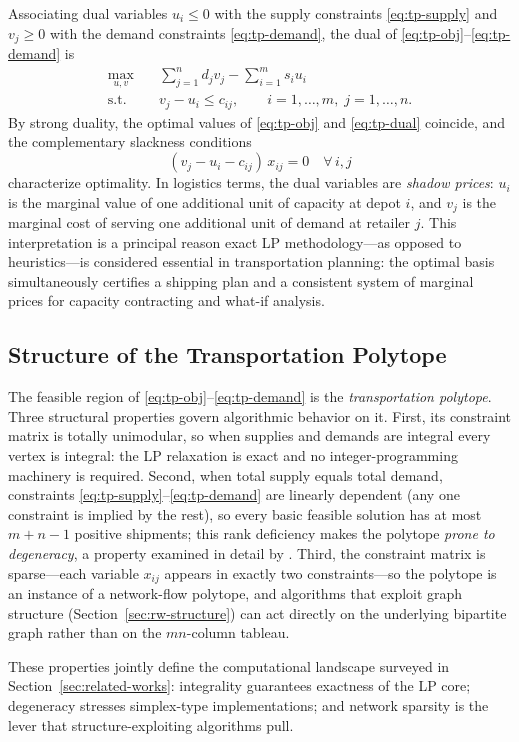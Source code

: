 Associating dual variables $u_i \leq 0$ with the supply constraints \eqref{eq:tp-supply} and $v_j \geq 0$ with the demand constraints \eqref{eq:tp-demand}, the dual of \eqref{eq:tp-obj}--\eqref{eq:tp-demand} is
\begin{align}
  \max_{u, v} \quad & \sum_{j=1}^{n} d_j v_j - \sum_{i=1}^{m} s_i u_i
    \label{eq:tp-dual}\\
  \text{s.t.} \quad & v_j - u_i \leq c_{ij}, \qquad i = 1,\dots,m,\; j = 1,\dots,n.
    \nonumber
\end{align}
By strong duality, the optimal values of \eqref{eq:tp-obj} and \eqref{eq:tp-dual} coincide, and the complementary slackness conditions
\begin{equation}
  (v_j - u_i - c_{ij})\, x_{ij} = 0 \quad \forall\, i, j
  \label{eq:compl-slack}
\end{equation}
characterize optimality. In logistics terms, the dual variables are \emph{shadow prices}: $u_i$ is the marginal value of one additional unit of capacity at depot $i$, and $v_j$ is the marginal cost of serving one additional unit of demand at retailer $j$. This interpretation is a principal reason exact LP methodology---as opposed to heuristics---is considered essential in transportation planning: the optimal basis simultaneously certifies a shipping plan and a consistent system of marginal prices for capacity contracting and what-if analysis.

\subsection{Structure of the Transportation Polytope}
\label{sec:polytope}

The feasible region of \eqref{eq:tp-obj}--\eqref{eq:tp-demand} is the \emph{transportation polytope}. Three structural properties govern algorithmic behavior on it. First, its constraint matrix is totally unimodular, so when supplies and demands are integral every vertex is integral: the LP relaxation is exact and no integer-programming machinery is required. Second, when total supply equals total demand, constraints \eqref{eq:tp-supply}--\eqref{eq:tp-demand} are linearly dependent (any one constraint is implied by the rest), so every basic feasible solution has at most $m+n-1$ positive shipments; this rank deficiency makes the polytope \emph{prone to degeneracy}, a property examined in detail by \citet{im2022degeneracy}. Third, the constraint matrix is sparse---each variable $x_{ij}$ appears in exactly two constraints---so the polytope is an instance of a network-flow polytope, and algorithms that exploit graph structure (Section~\ref{sec:rw-structure}) can act directly on the underlying bipartite graph rather than on the $mn$-column tableau.

These properties jointly define the computational landscape surveyed in Section~\ref{sec:related-works}: integrality guarantees exactness of the LP core; degeneracy stresses simplex-type implementations; and network sparsity is the lever that structure-exploiting algorithms pull.
